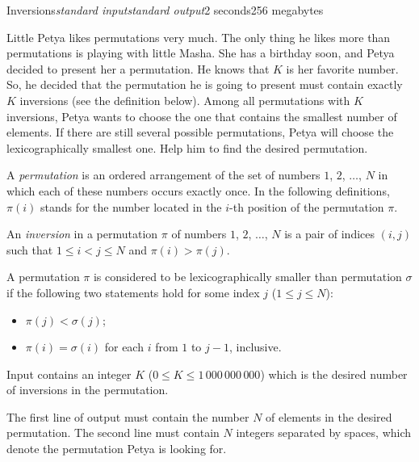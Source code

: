 \begin{problem}{Inversions}{\textsl{standard input}}{\textsl{standard output}}{2 seconds}{256 megabytes}

Little Petya likes permutations very much. The only thing he likes more than permutations is playing with little Masha. She has a birthday soon, and Petya decided to present her a permutation. He knows that $K$ is her favorite number. So, he decided that the permutation he is going to present must contain exactly $K$ inversions (see the definition below). Among all permutations with $K$ inversions, Petya wants to choose the one that contains the smallest number of elements. If there are still several possible permutations, Petya will choose the lexicographically smallest one. Help him to find the desired permutation.

A \emph{permutation} is an ordered arrangement of the set of numbers $1$, $2$, $\dots$, $N$ in which each of these numbers occurs exactly once. In the following definitions, $\pi(i)$ stands for the number located in the $i$-th position of the permutation $\pi$.

An \emph{inversion} in a permutation $\pi$ of numbers $1$, $2$, $\dots$, $N$ is a pair of indices $(i, j)$ such that $1 \le i < j \le N$ and $\pi(i) > \pi(j)$.

A permutation $\pi$ is considered to be lexicographically smaller than permutation $\sigma$ if the following two statements hold for some index $j$ ($1 \le j \le N$):
\begin{itemize}
\item $\pi(j) < \sigma(j)$;
\item $\pi(i) = \sigma(i)$ for each $i$ from $1$ to $j - 1$, inclusive.
\end{itemize}

\InputFile
Input contains an integer $K$ ($0 \le K \le 1\,000\,000\,000$) which is the desired number of inversions in the permutation.

\OutputFile
The first line of output must contain the number $N$ of elements in the desired permutation. The second line must contain $N$ integers separated by spaces, which denote the permutation Petya is looking for.

\Examples

\begin{example}
%
%
%
%
\end{example}

\end{problem}
